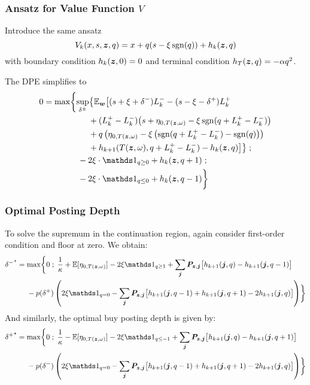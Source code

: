 \begin{frame}
\frametitle{Ansatz for Value Function $V$}
Introduce the same ansatz
\[ V_k (x,s,\bm{z},q) = x + q(s-\xi\operatorname{\mathrm{sgn}}(q)) + h_k(\bm{z},q) \]
with boundary condition $h_k(\bm{z},0) = 0$ and terminal condition $h_T(\bm{z},q) = -\alpha q^2$. 

The DPE simplifies to
\[
\begin{aligned}
0 & = \max \biggl\lbrace 
\sup_{\delta^\pm} \bigl\lbrace \E_{\bw} \bigl[
(s + \xi + \delta^-)L_k^- - (s - \xi - \delta^+)L_k^+ \\
& \hphantom{\sup_{\bu} \biggl\lbrace \E_{\bw} \biggl[ {}+{}} + (L_k^+ - L_k^-) \bigl( s + \eta_{0,T(\bz, \omega)}  -\xi\sgn( q + L_k^+ - L_k^-)   \bigr) \\
& \hphantom{\sup_{\bu} \biggl\lbrace \E_{\bw} \biggl[ {}+{}} + q\left( \eta_{0,T(\bz, \omega)}  -\xi \left( \sgn( q + L_k^+ - L_k^-) - \sgn(q) \right) \right) \\
& \hphantom{\sup_{\bu} \biggl\lbrace \E_{\bw} \biggl[ {}+{}} + h_{k+1}(T(\bz,\omega), q + L_k^+ - L_k^- ) -  h_k(\bz,q) \bigr] \bigr\rbrace \; ;\\
& \hphantom{{}={} \max \biggl\lbrace } -2\xi \cdot \indicator_{q \geq 0} + h_k(\bz,q+1) \; ; \\
& \hphantom{{}={} \max \biggl\lbrace } -2\xi \cdot \indicator_{q \leq 0} + h_k(\bz,q-1) \biggr\rbrace
\end{aligned}
\]
\end{frame}

\begin{frame}
\frametitle{Optimal Posting Depth}
To solve the supremum in the continuation region, again consider first-order condition and floor at zero. We obtain:
\[
\begin{aligned}
{\delta^-}^* & = \max \biggl\lbrace 0 \; ; \; \frac{1}{\kappa} + \E[\eta_{0,T(\bz, \omega)}] - 2 \xi \indicator_{q \geq 1} + \sum_{\bj} \bP_{\bz,\bj} \bigl[ h_{k+1}(\bj, q) - h_{k+1}(\bj, q-1) \bigr] \\
& \hphantom{{}={}} -p(\delta^+) \left( 2 \xi \indicator_{q = 0} - \sum_{\bj} \bP_{\bz,\bj} \bigl[ h_{k+1}(\bj, q-1) + h_{k+1}(\bj, q+1) -2 h_{k+1}(\bj, q)  \bigr] \right) \biggr\rbrace
\end{aligned}
\]
And similarly, the optimal buy posting depth is given by:
\[ 
\begin{aligned}
{\delta^+}^* & = \max \biggl\lbrace 0 \; ; \; \frac{1}{\kappa} - \E[\eta_{0,T(\bz, \omega)}] - 2 \xi \indicator_{q \leq -1} + \sum_{\bj} \bP_{\bz,\bj} \bigl[ h_{k+1}(\bj, q) - h_{k+1}(\bj, q+1) \bigr] \\
& \hphantom{{}={}} -p(\delta^-) \left( 2 \xi \indicator_{q = 0} - \sum_{\bj} \bP_{\bz,\bj} \bigl[ h_{k+1}(\bj, q-1) + h_{k+1}(\bj, q+1) -2 h_{k+1}(\bj, q)  \bigr] \right) \biggr\rbrace
\end{aligned}
\]
\end{frame}

